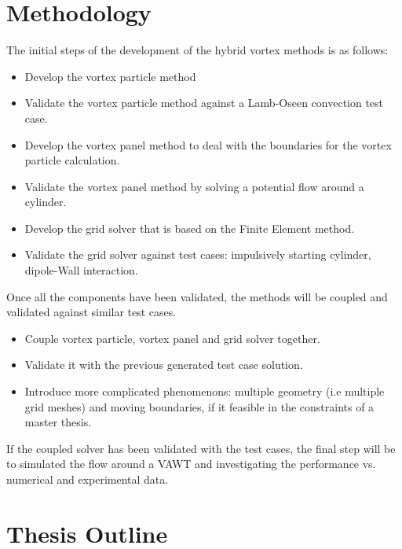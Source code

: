 \section{Methodology}
The initial steps of the development of the hybrid vortex methods is as follows:

\begin{itemize}
\item Develop the vortex particle method
\item Validate the vortex particle method against a Lamb-Oseen convection test case.
\item Develop the vortex panel method to deal with the boundaries for the vortex particle calculation. 
\item Validate the vortex panel method by solving a potential flow around a cylinder.
\item Develop the grid solver that is based on the Finite Element method. 
\item Validate the grid solver against test cases: impulsively starting cylinder, dipole-Wall interaction.
\end{itemize}

Once all the components have been validated, the methods will be coupled and validated against similar test cases.

\begin{itemize}
\item Couple vortex particle, vortex panel and grid solver together.
\item Validate it with the previous generated test case solution.
\item Introduce more complicated phenomenons: multiple geometry (i.e multiple grid meshes) and moving boundaries, if it feasible in the constraints of a master thesis.
\end{itemize}

If the coupled solver has been validated with the test cases, the final step will be to simulated the flow around a VAWT and investigating the performance vs. numerical and experimental data.


\section{Thesis Outline}


